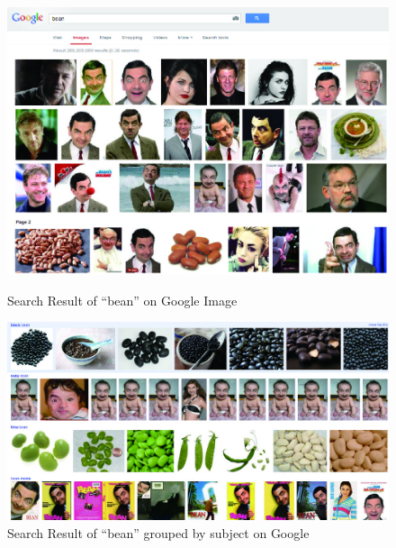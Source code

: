 \begin{figure}[th]
\begin{minipage}[t]{\linewidth}
\centering
\includegraphics[width=\columnwidth,natwidth=1011,natheight=708]{screen_bean3.jpg}
	\caption{Search Result of ``bean'' on Google Image}
	\label{fig:search-bean-on-google}
\end{minipage}
\begin{minipage}[t]{\linewidth}
\centering
\includegraphics[width=\columnwidth,natwidth=1240,natheight=645]{screen_bean_subj.jpg}
	\caption{Search Result of ``bean'' grouped by subject on Google}
	\label{fig:search-bean-by-subj}
\end{minipage}
\vspace*{-3mm}
\end{figure}

